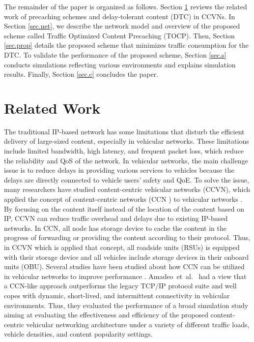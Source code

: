 \documentclass{ieeeaccess}
\begin{document}
The remainder of the paper is organized as follows.
Section \ref{sec2} reviews the related work of precaching schemes and delay-tolerant content (DTC) in CCVNs.
In Section \ref{sec.net}, we describe the network model and overview of the proposed scheme called Traffic Optimized Content Precaching (TOCP).
Then, Section \ref{sec.prop} details the proposed scheme that minimizes traffic consumption for the DTC.
To validate the performance of the proposed scheme, Section \ref{sec.s} conducts simulations reflecting various environments and explains simulation results.
Finally, Section \ref{sec.c} concludes the paper.

\section{Related Work} \label{sec2}
The traditional IP-based network has some limitations that disturb the efficient delivery of large-sized content, especially in vehicular networks.
These limitations include limited bandwidth, high latency, and frequent packet loss, which reduce the reliability and QoS of the network.
In vehicular networks, the main challenge issue is to reduce delays in providing various services to vehicles because the delays are directly connected to vehicle users' safety and QoE.
To solve the issue, many researchers have studied content-centric vehicular networks (CCVN), which applied the concept of content-centric networks (CCN \cite{Jacobson2009, zhang2014}) to vehicular networks \cite{Amadeo2012, Su2017, Wang2019}.
By focusing on the content itself instead of the location of the content based on IP, CCVN can reduce traffic overhead and delays due to existing IP-based networks.
In CCN, all node has storage device to cache the content in the progress of forwarding or providing the content according to their protocol.
Thus, in CCVN which is applied that concept, all roadside units (RSUs) is equipped with their storage device and all vehicles include storage devices in their onboard units (OBU).
Several studies have been studied about how CCN can be utilized in vehicular networks to improve performance \cite{Amadeo2012, Su2017, Wang2019}.
Amadeo~et~al.~\cite{Amadeo2012} had a view that a CCN-like approach outperforms the legacy TCP/IP protocol suite and well copes with dynamic, short-lived, and intermittent connectivity in vehicular environments. Thus, they evaluated the performance of a broad simulation study aiming at evaluating the effectiveness and efficiency of the proposed content-centric vehicular networking architecture under a variety of different traffic loads, vehicle densities, and content popularity settings.
\end{document}
